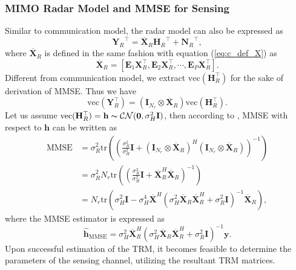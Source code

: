 \documentclass[lettersize,journal]{IEEEtran}
\newcommand{\nocolor}[1]{{\color{black}#1}}
\begin{document}
\subsubsection{MIMO Radar Model and MMSE for Sensing}
Similar to communication model, the radar model can also be expressed as
\begin{equation}
\label{eq:r_model_4}
    {\mathbf{Y}_R}^{\top} = \overline{\mathbf{X}}_R{\mathbf{H}_R}^{\top} + {\mathbf{N}_R}^{\top},
\end{equation}
where $\overline{\mathbf{X}}_R$ is defined in the same fashion with equation (\ref{eq:c_def_X}) as
\begin{equation}
\label{eq:r_def_X}
    \overline{\mathbf{X}}_R = [\mathbf{E}_{1}\mathbf{X}_R^{\top},\mathbf{E}_{2}\mathbf{X}_R^{\top},\cdots,\mathbf{E}_{P}\mathbf{X}_R^{\top}].
\end{equation}
Different from communication model, we extract $\text{vec}(\mathbf{H}_R^{\top})$ for the sake of derivation of MMSE. Thus we have
\begin{equation}
     \text{vec}(\mathbf{Y}_R^{\top}) = (\mathbf{I}_{N_r}\otimes\overline{\mathbf{X}}_R)\text{vec}(\mathbf{H}_R^{\top}).
\end{equation}
Let us assume $\text{vec}(\mathbf{H}_R^{\top})=\mathbf{h}\thicksim\mathcal{CN}(\mathbf{0},\sigma_H^2\mathbf{I})$, then according to \cite{kay1993fundamentals,tang2021constrained}, MMSE with respect to $\mathbf{h}$ can be written as
\begin{equation}
\begin{aligned}
    \mathrm{MMSE} &= \sigma_R^2\text{tr}\left(\left(\frac{\sigma_R^2}{\sigma_H^2}\mathbf{I}+(\mathbf{I}_{N_r}\otimes\overline{\mathbf{X}}_R)^H(\mathbf{I}_{N_r}\otimes\overline{\mathbf{X}}_R)\right)^{-1}\right) \\
    &= \sigma_R^2N_r\text{tr}\left(\left(\frac{\sigma_R^2}{\sigma_H^2}\mathbf{I}+\overline{\mathbf{X}}_R^H\overline{\mathbf{X}}_R\right)^{-1}\right) \\
    &= N_r\text{tr}(\sigma_H^2\mathbf{I} - \sigma_H^4\overline{\mathbf{X}}^H(\sigma_H^2\overline{\mathbf{X}}_R\overline{\mathbf{X}}_R^H + \sigma_R^2\mathbf{I})^{-1}\overline{\mathbf{X}}_R),
\end{aligned}
\end{equation}
where the MMSE estimator is expressed as
\begin{equation}
   \hat{\mathbf{h}}_\mathrm{MMSE} = \sigma_H^2\overline{\mathbf{X}}_R^H(\sigma_H^2\overline{\mathbf{X}}_R\overline{\mathbf{X}}_R^H + \sigma_R^2\mathbf{I})^{-1}\mathbf{y}. 
\end{equation}
\nocolor{Upon successful estimation of the TRM, it becomes feasible to determine the parameters of the sensing channel, utilizing the resultant TRM matrices.}
\end{document}

